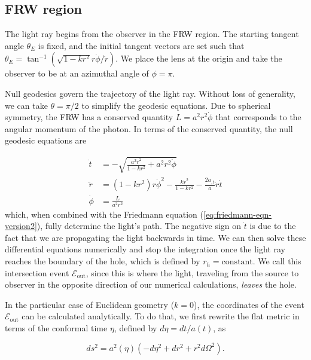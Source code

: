 \subsection{FRW region}

The light ray begins from the observer in the FRW region. The starting tangent angle $\theta_E$ is fixed, and the initial tangent vectors are set such that $\theta_E = \tan^{-1}(\sqrt{1-kr^2}r\dot{\phi}/\dot{r})$. We place the lens at the origin and take the observer to be at an azimuthal angle of $\phi = \pi$. 

Null geodesics govern the trajectory of the light ray. Without loss of generality, we can take $\theta = \pi/2$ to simplify the geodesic equations. Due to spherical symmetry, the FRW has a conserved quantity $L = a^2 r^2 \dot{\phi}$ that corresponds to the angular momentum of the photon. In terms of the conserved quantity, the null geodesic equations are

\begin{subequations}
  \begin{align}
    \dot{t} &= -\sqrt{\frac{a^2\dot{r}^2}{1-kr^2} + a^2r^2 \dot{\phi}}\\
    \ddot{r}  &= (1-kr^2)r\dot{\phi}^2 - \frac{k\dot{r}^2}{1-kr^2} - \frac{2a_{,t}}{a}\dot{r}\dot{t}\\
    \dot{\phi} &= \frac{L}{a^2 r^2}
  \end{align}
  \label{eq:frw-null-geodesics}%
\end{subequations}
which, when combined with the Friedmann equation (\autoref{eq:friedmann-eqn-version2}), fully determine the light's path. The negative sign on $\dot{t}$ is due to the fact that we are propagating the light backwards in time. We can then solve these differential equations numerically and stop the integration once the light ray reaches the boundary of the hole, which is defined by $r_h = \text{constant}$. We call this intersection event $\mathcal{E}_{\text{out}}$, since this is where the light, traveling from the source to observer in the opposite direction of our numerical calculations, \emph{leaves} the hole. 

In the particular case of Euclidean geometry ($k = 0$), the coordinates of the event $\mathcal{E}_{\text{out}}$ can be calculated analytically. To do that, we first rewrite the flat metric in terms of the conformal time $\eta$, defined by $d\eta = dt/a(t)$, as

\begin{equation}
  ds^2 = a^2(\eta) \left ( -d \eta^2 + dr^2 + r^2 d \Omega^2 \right ).
  \label{eq:frw-metric-conformal-time}
\end{equation}

